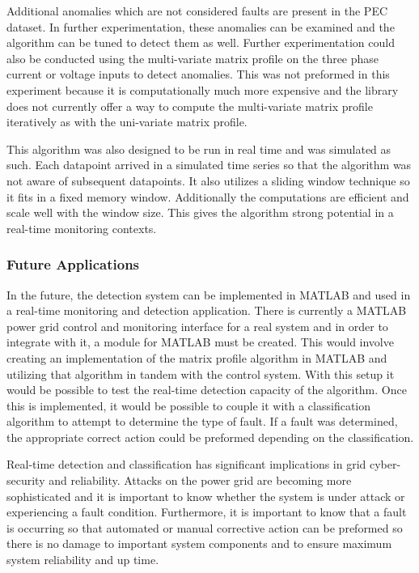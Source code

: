 Additional anomalies which are not considered faults are present in the PEC dataset. In further experimentation, these anomalies can be examined and the algorithm can be tuned to detect them as well. Further experimentation could also be conducted using the multi-variate matrix profile on the three phase current or voltage inputs to detect anomalies. This was not preformed in this experiment because it is computationally much more expensive and the library does not currently offer a way to compute the multi-variate matrix profile iteratively as with the uni-variate matrix profile.

This algorithm was also designed to be run in real time and was simulated as such. Each datapoint arrived in a simulated time series so that the algorithm was not aware of subsequent datapoints. It also utilizes a sliding window technique so it fits in a fixed memory window. Additionally the computations are efficient and scale well with the window size. This gives the algorithm strong potential in a real-time monitoring contexts.

\subsubsection{Future Applications}
In the future, the detection system can be implemented in MATLAB and used in a real-time monitoring and detection application. There is currently a MATLAB power grid control and monitoring interface for a real system and in order to integrate with it, a module for MATLAB must be created. This would involve creating an implementation of the matrix profile algorithm in MATLAB and utilizing that algorithm in tandem with the control system. With this setup it would be possible to test the real-time detection capacity of the algorithm. Once this is implemented, it would be possible to couple it with a classification algorithm to attempt to determine the type of fault. If a fault was determined, the appropriate correct action could be preformed depending on the classification. 

Real-time detection and classification has significant implications in grid cyber-security and reliability. Attacks on the power grid are becoming more sophisticated and it is important to know whether the system is under attack or experiencing a fault condition. Furthermore, it is important to know that a fault is occurring so that automated or manual corrective action can be preformed so there is no damage to important system components and to ensure maximum system reliability and up time.

